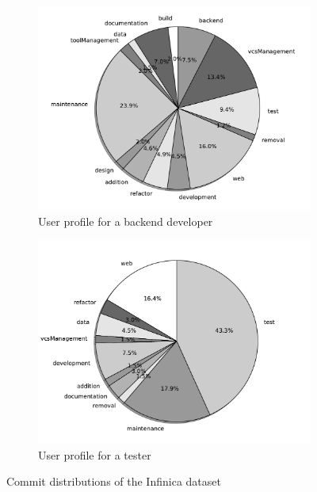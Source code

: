 \begin{figure}[ht]
   \centering
   \begin{subfigure}[t]{.5\textwidth}
      \centering
      \includegraphics[width=\linewidth]{figures/infinica_developer.pdf}
      \caption{User profile for a backend developer}
      \label{fig:developer} 
   \end{subfigure}%
   \begin{subfigure}[t]{.5\textwidth}
      \centering
      \includegraphics[width=\linewidth]{figures/infinica_tester.pdf}
      \caption{User profile for a tester}
      \label{fig:tester} 
   \end{subfigure}
   \caption{Commit distributions of the Infinica dataset}
   \label{fig:test}
\end{figure}

